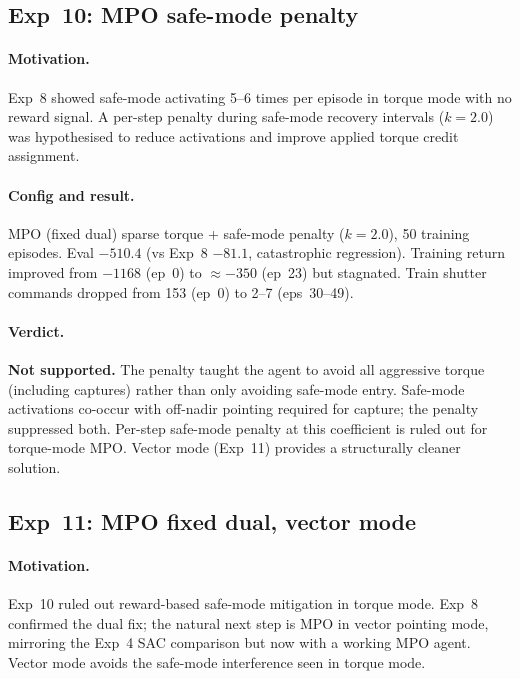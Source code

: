 \subsection{Exp~10: MPO safe-mode penalty}
\label{sec:exp10}

\paragraph{Motivation.}
Exp~8 showed safe-mode activating 5--6 times per episode in torque mode with no reward signal.
A per-step penalty during safe-mode recovery intervals ($k=2.0$) was hypothesised to reduce activations
and improve applied torque credit assignment.

\paragraph{Config and result.}
MPO (fixed dual) sparse torque + safe-mode penalty ($k=2.0$), 50 training episodes.
Eval $-510.4$ (vs Exp~8 $-81.1$, catastrophic regression).
Training return improved from $-1168$ (ep~0) to $\approx-350$ (ep~23) but stagnated.
Train shutter commands dropped from 153 (ep~0) to 2--7 (eps~30--49).

\paragraph{Verdict.}
\textbf{Not supported.}
The penalty taught the agent to avoid all aggressive torque (including captures) rather than
only avoiding safe-mode entry.
Safe-mode activations co-occur with off-nadir pointing required for capture; the penalty suppressed both.
Per-step safe-mode penalty at this coefficient is ruled out for torque-mode MPO.
Vector mode (Exp~11) provides a structurally cleaner solution.

\subsection{Exp~11: MPO fixed dual, vector mode}
\label{sec:exp11}

\paragraph{Motivation.}
Exp~10 ruled out reward-based safe-mode mitigation in torque mode.
Exp~8 confirmed the dual fix; the natural next step is MPO in vector pointing mode,
mirroring the Exp~4 SAC comparison but now with a working MPO agent.
Vector mode avoids the safe-mode interference seen in torque mode.

